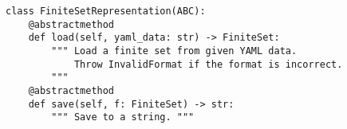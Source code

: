 \par\begin{minipage}{60ex}
\begin{verbatim}
class FiniteSetRepresentation(ABC):
    @abstractmethod
    def load(self, yaml_data: str) -> FiniteSet:
        """ Load a finite set from given YAML data.
            Throw InvalidFormat if the format is incorrect.
        """
    @abstractmethod
    def save(self, f: FiniteSet) -> str:
        """ Save to a string. """
\end{verbatim}
\end{minipage}\par